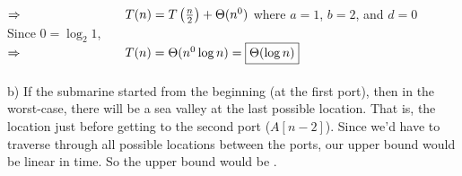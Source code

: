 \documentclass[11pt]{article}
\begin{document}
\begin{enumerate}
${ \Rightarrow \-\hspace{2.85cm} T(n) = T \left(\frac{n}{2}\right)+\Theta(n^0)}$  where ${a = 1}$, ${b = 2}$, and ${d = 0}$ \\ 
\-\hspace{2cm} Since ${0 = \log_2 1}$,\\
${ \Rightarrow \-\hspace{2.85cm} T(n) = \Theta(n^0 \log n) = \boxed{\Theta(\log n)}}$\\

\- \\
b)
If the submarine started from the beginning (at the first port), then in the worst-case, there will be a sea valley at the last possible location. That is, the location just before getting to the second port ($A[n-2]$). Since we'd have to traverse through all possible locations between the ports, our upper bound would be linear in time. So the upper bound would be .

\end{enumerate}
\end{document}
